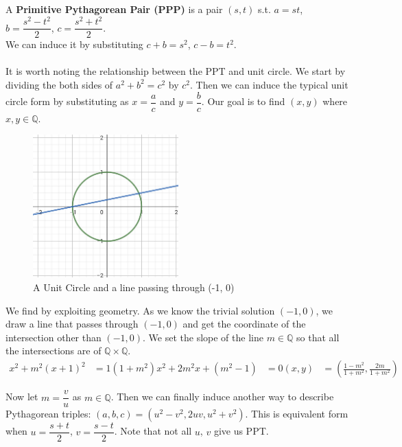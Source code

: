\noindent
A \textbf{Primitive Pythagorean Pair (PPP)} is a pair $(s, t)$ s.t. $a = st$, $b = \dfrac{s^{2} - t^{2}}{2}$, $c = \dfrac{s^{2} + t^{2}}{2}$. \\
We can induce it by substituting $c + b = s^{2}$, $c - b = t^{2}$. \\
\\
It is worth noting the relationship between the PPT and unit circle. We start by dividing the both sides of $a^{2} + b^{2} = c^{2}$ by $c^{2}$. Then we can induce the typical unit circle form by substituting as $x = \dfrac{a}{c}$ and $y = \dfrac{b}{c}$. Our goal is to find $(x, y)$ where $x, y\in \mathbb{Q}$.

\begin{figure}[h]
\caption{A Unit Circle and a line passing through (-1, 0)}
\centering
\includegraphics[width=0.5\textwidth]{number_theory/fig2-1.jpg}
\end{figure}

We find by exploiting geometry. As we know the trivial solution $(-1, 0)$, we draw a line that passes through $(-1, 0)$ and get the coordinate of the intersection other than $(-1, 0)$. We set the slope of the line $m\in \mathbb{Q}$ so that all the intersections are of $\mathbb{Q}\times \mathbb{Q}$. 
\begin{align*}
x^{2} + m^{2}(x + 1)^{2} &= 1
(1 + m^{2})x^{2} + 2m^{2}x + (m^{2} - 1) &= 0
(x, y) &= (\frac{1 - m^{2}}{1 + m^{2}}, \frac{2m}{1 + m^{2}})
\end{align*}

Now let $m = \dfrac{v}{u}$ as $m\in \mathbb{Q}$. Then we can finally induce another way to describe Pythagorean triples: $(a, b, c) = (u^{2} - v^{2}, 2uv, u^{2} + v^{2})$. This is equivalent form when $u = \dfrac{s + t}{2}$, $v = \dfrac{s - t}{2}$. Note that not all $u$, $v$ give us PPT.